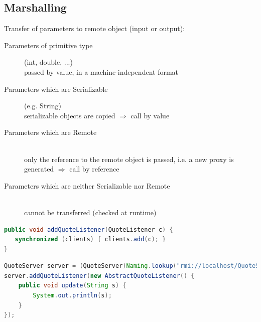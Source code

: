 \documentclass[10pt]{article}
\newcommand{\Ra}{\Rightarrow}
\begin{document}
\subsection{Marshalling}
Transfer of parameters to remote object (input or output):
\begin{description}
	\item[Parameters of primitive type] (int, double, ...) \hfill \\
		passed by value, in a machine-independent format
	\item[Parameters which are Serializable] (e.g. String) \hfill \\
		serializable objects are copied $\Ra$ call by value
	\item[Parameters which are Remote] \hfill \\
		only the reference to the remote object is passed, i.e. a new proxy is generated $\Ra$ call by reference
	\item[Parameters which are neither Serializable nor Remote] \hfill \\
		cannot be transferred (checked at runtime)
\end{description}
\begin{lstlisting}[language=Java, caption=QuoteServer, style=JavaStyle]
public void addQuoteListener(QuoteListener c) {
   synchronized (clients) { clients.add(c); }
}
\end{lstlisting}
\begin{lstlisting}[language=Java, caption=QuoteClient, style=JavaStyle]
QuoteServer server = (QuoteServer)Naming.lookup("rmi://localhost/QuoteServer");
server.addQuoteListener(new AbstractQuoteListener() {
	public void update(String s) {
		System.out.println(s);
	}
});
\end{lstlisting}
\end{document}
